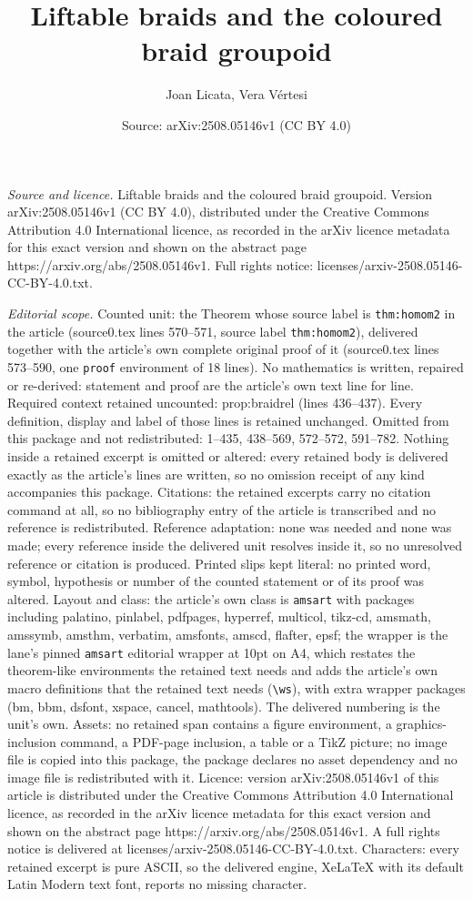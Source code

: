 \documentclass[10pt,a4paper]{amsart}
\title[Liftable braids and the coloured braid groupoid]{Liftable braids and the coloured braid groupoid}
\author{Joan Licata, Vera V\'ertesi}
\date{Source: arXiv:2508.05146v1 (CC BY 4.0)}
\begin{document}
\maketitle

\noindent\emph{Source and licence.} Liftable braids and the coloured braid groupoid. Version arXiv:2508.05146v1 (CC BY 4.0), distributed under the Creative Commons Attribution 4.0 International licence, as recorded in the arXiv licence metadata for this exact version and shown on the abstract page https://arxiv.org/abs/2508.05146v1. Full rights notice: licenses/arxiv-2508.05146-CC-BY-4.0.txt.\par\smallskip

\noindent\textit{Editorial scope.} Counted unit: the Theorem whose source label is \texttt{thm:homom2} in the article (source0.tex lines 570--571, source label \texttt{thm:homom2}), delivered together with the article's own complete original proof of it (source0.tex lines 573--590, one \texttt{proof} environment of 18 lines). No mathematics is written, repaired or re-derived: statement and proof are the article's own text line for line. Required context retained uncounted: prop:braidrel (lines 436--437). Every definition, display and label of those lines is retained unchanged. Omitted from this package and not redistributed: 1--435, 438--569, 572--572, 591--782. Nothing inside a retained excerpt is omitted or altered: every retained body is delivered exactly as the article's lines are written, so no omission receipt of any kind accompanies this package. Citations: the retained excerpts carry no citation command at all, so no bibliography entry of the article is transcribed and no reference is redistributed. Reference adaptation: none was needed and none was made; every reference inside the delivered unit resolves inside it, so no unresolved reference or citation is produced. Printed slips kept literal: no printed word, symbol, hypothesis or number of the counted statement or of its proof was altered. Layout and class: the article's own class is \texttt{amsart} with packages including palatino, pinlabel, pdfpages, hyperref, multicol, tikz-cd, amsmath, amssymb, amsthm, verbatim, amsfonts, amscd, flafter, epsf; the wrapper is the lane's pinned \texttt{amsart} editorial wrapper at 10pt on A4, which restates the theorem-like environments the retained text needs and adds the article's own macro definitions that the retained text needs (\texttt{\textbackslash ws}), with extra wrapper packages (bm, bbm, dsfont, xspace, cancel, mathtools). The delivered numbering is the unit's own. Assets: no retained span contains a figure environment, a graphics-inclusion command, a PDF-page inclusion, a table or a TikZ picture; no image file is copied into this package, the package declares no asset dependency and no image file is redistributed with it. Licence: version arXiv:2508.05146v1 of this article is distributed under the Creative Commons Attribution 4.0 International licence, as recorded in the arXiv licence metadata for this exact version and shown on the abstract page https://arxiv.org/abs/2508.05146v1. A full rights notice is delivered at licenses/arxiv-2508.05146-CC-BY-4.0.txt. Characters: every retained excerpt is pure ASCII, so the delivered engine, XeLaTeX with its default Latin Modern text font, reports no missing character.
\end{document}
